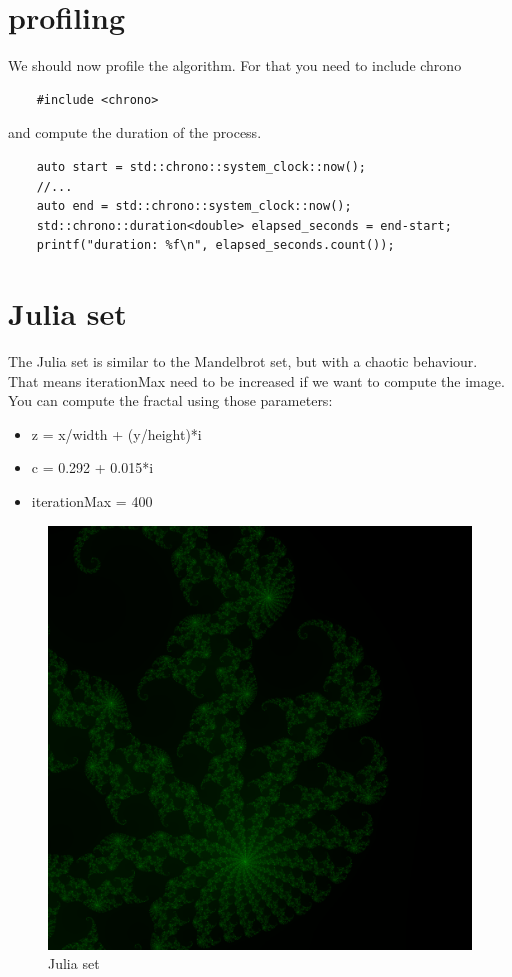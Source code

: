 \documentclass{article}
\begin{document}
\section{profiling}
We should now profile the algorithm. For that you need to include chrono
\begin{lstlisting}
	#include <chrono>
\end{lstlisting}
and compute the duration of the process.
\begin{lstlisting}
	auto start = std::chrono::system_clock::now();
	//...
	auto end = std::chrono::system_clock::now();
	std::chrono::duration<double> elapsed_seconds = end-start;
	printf("duration: %f\n", elapsed_seconds.count());
\end{lstlisting}

\section{Julia set}
The Julia set is similar to the Mandelbrot set, but with a chaotic behaviour. That means iterationMax need to be increased if we want to compute the image. You can compute the fractal using those parameters:
\begin{itemize}
	\item z = x/width + (y/height)*i
	\item c = 0.292 + 0.015*i
	\item iterationMax = 400
\end{itemize}
\newpage
\begin{figure}[h]
	\centering
	\includegraphics[scale=0.4]{figures/julia.png}
	\caption{Julia set}
\end{figure}
\end{document}
